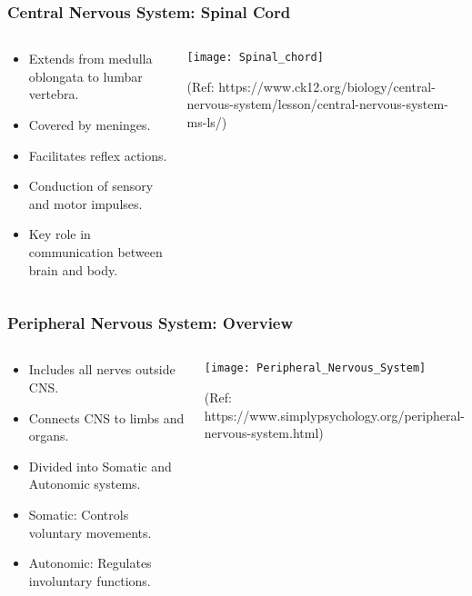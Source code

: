 \begin{frame}[fragile]\frametitle{Central Nervous System: Spinal Cord}
\begin{columns}
    \begin{column}[T]{0.5\linewidth}
      \begin{itemize}
		\item Extends from medulla oblongata to lumbar vertebra.
		\item Covered by meninges.
		\item Facilitates reflex actions.
		\item Conduction of sensory and motor impulses.
		\item Key role in communication between brain and body.
	  \end{itemize}
    \end{column}
    \begin{column}[T]{0.5\linewidth}
		\begin{center}
		\texttt{[image: Spinal\_chord]}
		
		{\tiny (Ref: https://www.ck12.org/biology/central-nervous-system/lesson/central-nervous-system-ms-ls/)}
		\end{center}	
    \end{column}
  \end{columns}
\end{frame}

\begin{frame}[fragile]\frametitle{Peripheral Nervous System: Overview}
\begin{columns}
    \begin{column}[T]{0.5\linewidth}
      \begin{itemize}
		\item Includes all nerves outside CNS.
		\item Connects CNS to limbs and organs.
		\item Divided into Somatic and Autonomic systems.
		\item Somatic: Controls voluntary movements.
		\item Autonomic: Regulates involuntary functions.
	  \end{itemize}
    \end{column}
    \begin{column}[T]{0.5\linewidth}
		\begin{center}
		\texttt{[image: Peripheral\_Nervous\_System]}
		
		{\tiny (Ref: https://www.simplypsychology.org/peripheral-nervous-system.html)}		
		\end{center}	
    \end{column}
  \end{columns}
\end{frame}

